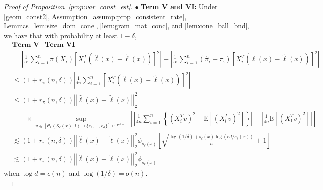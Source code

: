 \documentclass[ejsv2,noshowframe]{imsart}
\theoremstyle{plain}
\theoremstyle{definition}
\theoremstyle{remark}
\newcommand{\norm}[1]{\left|\left| #1 \right|\right|}
\renewcommand{\hat}{\widehat}
\renewcommand{\tilde}{\widetilde}
\begin{document}
\begin{proof}[Proof of Proposition~\ref{prop:var_const_est}]
	
	\noindent$\bullet$ \textbf{Term V and VI:} Under \eqref{geom_const2}, Assumption~\ref{assump:prop_consistent_rate}, Lemmas~\ref{lem:size_dom_cone}, \ref{lem:gram_mat_conc}, and \ref{lem:cone_ball_bnd}, we have that with probability at least $1-\delta$,
	\begin{align*}
		&\textbf{Term V} + \textbf{Term VI} \\
		&= \left|\frac{1}{4n}\sum_{i=1}^n \pi(X_i) \left[X_i^T\left(\hat{\ell}(x) -\tilde{\ell}(x)\right)\right]^2\right| + \left|\frac{1}{4n}\sum_{i=1}^n \left(\hat{\pi}_i -\pi_i\right) \left[X_i^T\left(\hat{\ell}(x) -\tilde{\ell}(x)\right)\right]^2\right|\\
		&\leq \left(1+r_{\pi}(n,\delta)\right) \left|\frac{1}{4n}\sum_{i=1}^n \left[X_i^T\left(\hat{\ell}(x) -\tilde{\ell}(x)\right)\right]^2\right|\\
		&\leq \left(1+r_{\pi}(n,\delta)\right)\norm{\hat{\ell}(x) -\tilde{\ell}(x)}_2^2 \\
		&\quad \quad \times \sup_{v\in \left[\mathcal{C}_1(S_{\ell}(x),3) \cup \{e_1,...,e_d\} \right] \cap \mathbb{S}^{d-1}}\left[\left|\frac{1}{4n}\sum_{i=1}^n \left\{(X_i^Tv)^2 -\mathrm{E}\left[(X_i^Tv)^2\right] \right\}\right| + \left|\frac{1}{4n}\mathrm{E}\left[(X_1^T v)^2\right]\right| \right]\\
		&\lesssim \left(1+r_{\pi}(n,\delta)\right)\norm{\hat{\ell}(x) -\tilde{\ell}(x)}_2^2\phi_{s_{\ell}(x)}\left[\sqrt{\frac{\log(1/\delta) + s_{\ell}(x)\log(ed/s_{\ell}(x))}{n}} + 1 \right] \\
		&\lesssim \left(1+r_{\pi}(n,\delta)\right)\norm{\hat{\ell}(x) -\tilde{\ell}(x)}_2^2\phi_{s_{\ell}(x)}
	\end{align*}
	when $\log d=o(n)$ and $\log(1/\delta)=o(n)$.\\
	

\end{proof}
\end{document}
